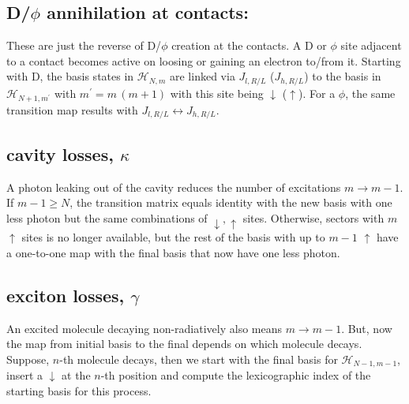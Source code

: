 \documentclass[a4paper,twocolumn]{revtex4-1} %
\newcommand{\da}{\downarrow}
\newcommand{\ua}{\uparrow}
\begin{document}
\subsection{ D/$\phi$ annihilation at contacts: }
These are just the reverse of D/$\phi$ creation at the contacts.
A D or $\phi$ site adjacent to a contact becomes active on loosing or gaining an electron to/from it.
Starting with D, 
the basis states in $\mathcal{H}_{N,m}$
are linked via $J_{l,R/L}$ ($J_{h,R/L}$) to 
the basis in $\mathcal{H}_{N+1,m^\prime}$ with $m^\prime=m\,(m+1)$
with this site being $\da$ ($\ua$).
For a $\phi$, 
the same transition map results with $J_{l,R/L} \leftrightarrow J_{h,R/L} $.

\subsection{cavity losses, $\kappa$}
A photon leaking out of the cavity reduces the number of excitations $m \rightarrow m-1$.
If $m-1 \geq N$, the transition matrix equals identity with the new basis with one less photon but the same combinations of $\da,\ua$ sites.
Otherwise, sectors with $m$ $\ua$ sites is no longer available, but
the rest of the basis with up to $m-1$ $\ua$ 
have a one-to-one map with the final basis that now have one less photon.

\subsection{exciton losses, $\gamma$}
An excited molecule decaying non-radiatively also means $m \rightarrow m-1$.
But, now the map from initial basis to the final depends on which molecule decays.
Suppose, $n$-th molecule decays, then we start with the final basis for 
$\mathcal{H}_{N-1,m-1}$,
insert a $\da$ at the $n$-th position and compute 
the lexicographic index of the starting basis for this process.
\end{document}

